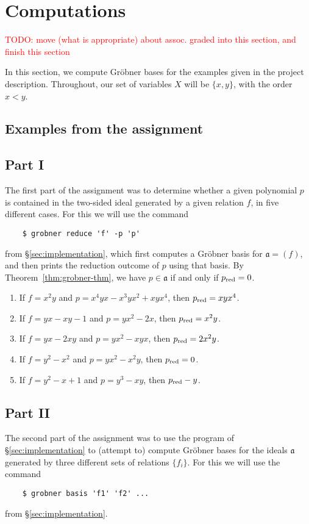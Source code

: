 \section{Computations}\label{sec:examples}
\textcolor{red}{TODO: move (what is appropriate) about assoc. graded into this section, and finish this section}

In this section, we compute Gr\"obner bases for the examples given in the project description. Throughout, our set of variables $X$ will be $\{x,y\}$, with the order $x < y$.

\subsection{Examples from the assignment}
\subsection*{Part I}

The first part of the assignment was to determine whether a given polynomial $p$ is contained in the two-sided ideal generated by a given relation $f$, in five different cases. For this we will use the command
\begin{verbatim}
	$ grobner reduce 'f' -p 'p'
\end{verbatim}
from \S\ref{sec:implementation}, which first computes a Gr\"obner basis for $\mathfrak{a} = (f)$, and then prints the reduction outcome of $p$ using that basis. By Theorem~\ref{thm:grobner-thm}, we have $p\in\mathfrak{a}$ if and only if $p_{\mathrm{red}}=0$.

\begin{enumerate}
	\item If $f = x^2y$ and $p = x^4 y x - x^3 y x^2 + xyx^4$, then $p_{\mathrm{red}} = xyx^4$.
	\item If $f = yx - xy - 1$ and $p = yx^2 - 2x$, then $p_{\mathrm{red}} = x^2 y$.
    \item If $f = yx - 2xy$ and $p = yx^2 - xyx$, then $p_{\mathrm{red}} = 2x^2y$.
    \item If $f = y^2 - x^2$ and $p = yx^2 - x^2y$, then $p_{\mathrm{red}} = 0$.
    \item If $f = y^2 - x + 1$ and $p=y^3 - xy$, then $p_{\mathrm{red}} - y$.
\end{enumerate}

\subsection*{Part II}

The second part of the assignment was to use the program of \S\ref{sec:implementation} to (attempt to) compute Gr\"obner bases for the ideals $\mathfrak{a}$ generated by three different sets of relations $\{f_i\}$. For this we will use the command
\begin{verbatim}
	$ grobner basis 'f1' 'f2' ...
\end{verbatim}
from \S\ref{sec:implementation}.

